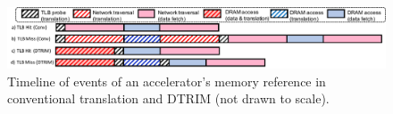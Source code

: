 \begin{figure}
	\includegraphics[width=\textwidth]{figures/Fig345.pdf}
	\caption{Timeline of events of an accelerator's memory reference in conventional translation and DTRIM (not drawn to scale).}
	\label{fig:timeline}
\end{figure}





 





